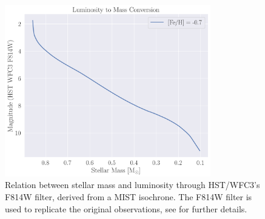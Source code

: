 \begin{figure}
    \centering
    \includegraphics[width=0.8\textwidth]{figures/isochrone_conversion.png}
    \caption{Relation between stellar mass and luminosity through HST/WFC3's F814W filter, derived
        from a MIST isochrone. The F814W filter is used to replicate the original observations, see
        \citet{Sollima2017} for further details.}
    \label{fig:2/isochrone}
\end{figure}
